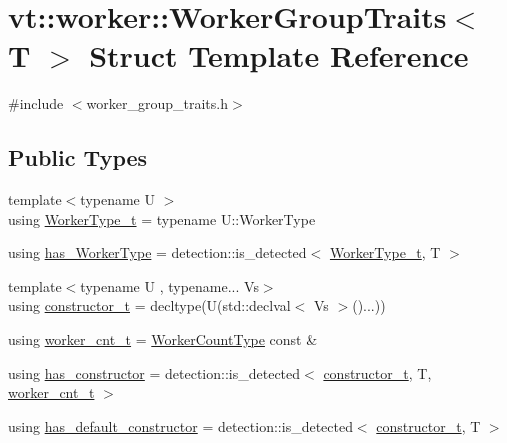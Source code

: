 \hypertarget{structvt_1_1worker_1_1_worker_group_traits}{}\section{vt\+:\+:worker\+:\+:Worker\+Group\+Traits$<$ T $>$ Struct Template Reference}
\label{structvt_1_1worker_1_1_worker_group_traits}


{\ttfamily \#include $<$worker\+\_\+group\+\_\+traits.\+h$>$}

\subsection*{Public Types}
\begin{DoxyCompactItemize}
\item 
{\footnotesize template$<$typename U $>$ }\\using \hyperlink{structvt_1_1worker_1_1_worker_group_traits_a977cb0db3e7ff57c4eb45f6ca2cdd38c}{Worker\+Type\+\_\+t} = typename U\+::\+Worker\+Type
\item 
using \hyperlink{structvt_1_1worker_1_1_worker_group_traits_a6780167e5822e2608ec4f79258e08b5d}{has\+\_\+\+Worker\+Type} = detection\+::is\+\_\+detected$<$ \hyperlink{structvt_1_1worker_1_1_worker_group_traits_a977cb0db3e7ff57c4eb45f6ca2cdd38c}{Worker\+Type\+\_\+t}, T $>$
\item 
{\footnotesize template$<$typename U , typename... Vs$>$ }\\using \hyperlink{structvt_1_1worker_1_1_worker_group_traits_a637c87b51f757c6925f235f64c426f4e}{constructor\+\_\+t} = decltype(U(std\+::declval$<$ Vs $>$()...))
\item 
using \hyperlink{structvt_1_1worker_1_1_worker_group_traits_ab532e883384999599393386ba277a84a}{worker\+\_\+cnt\+\_\+t} = \hyperlink{namespacevt_aa93398ea48f2cb6c188512250f7cc248}{Worker\+Count\+Type} const  \&
\item 
using \hyperlink{structvt_1_1worker_1_1_worker_group_traits_af77f44bab3ba4312e75b6088e93db9e2}{has\+\_\+constructor} = detection\+::is\+\_\+detected$<$ \hyperlink{structvt_1_1worker_1_1_worker_group_traits_a637c87b51f757c6925f235f64c426f4e}{constructor\+\_\+t}, T, \hyperlink{structvt_1_1worker_1_1_worker_group_traits_ab532e883384999599393386ba277a84a}{worker\+\_\+cnt\+\_\+t} $>$
\item 
using \hyperlink{structvt_1_1worker_1_1_worker_group_traits_abc35e0b7a80a06de230522956e50f741}{has\+\_\+default\+\_\+constructor} = detection\+::is\+\_\+detected$<$ \hyperlink{structvt_1_1worker_1_1_worker_group_traits_a637c87b51f757c6925f235f64c426f4e}{constructor\+\_\+t}, T $>$

\end{DoxyCompactItemize}
